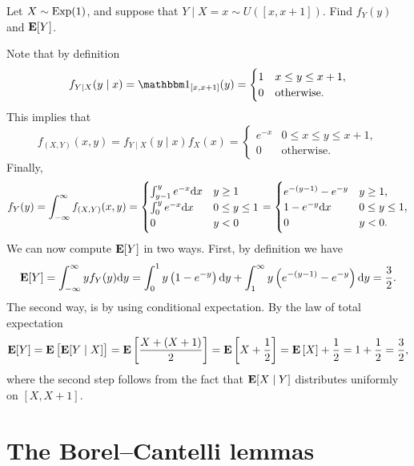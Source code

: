 \documentclass[11pt,a4paper]{article}
\begin{document}
\begin{exercise}
  Let $X \sim \operatorname{Exp}(1)$, and suppose that $Y \mid X = x \sim U([x,x+1])$.
  Find $f_Y(y)$ and $\mathbf{E}[Y]$.
\end{exercise}
\begin{solution}
  Note that by definition
  \[
    f_{Y \mid X}(y \mid x) =
    \ind_{[x,x+1]}(y) =
    \begin{cases}
      1 &x \le y \le x+1, \\
      0 &\text{otherwise}.
    \end{cases}
  \]
  This implies that
  \[
    f_{(X,Y)}(x,y) =
    f_{Y \mid X}(y \mid x) f_X(x) =
    \begin{cases}
      e^{-x} &0 \le x \le y \le x+1, \\
      0 &\text{otherwise}.
    \end{cases}
  \]
  Finally,
  \[
    f_Y(y) =
    \int_{-\infty}^{\infty} f_{(X,Y)}(x,y) =
    \begin{cases}
      \int_{y-1}^{y} e^{-x} \dx &y \geq 1 \\
      \int_{0}^{y} e^{-x} \dx &0 \le y \le 1 \\
      0 &y < 0
    \end{cases} =
    \begin{cases}
      e^{-(y-1)} - e^{-y} &y \geq 1, \\
      1 - e^{-y} \dx &0 \le y \le 1, \\
      0 &y < 0.
    \end{cases}
  \]
  We can now compute $\mathbf{E}[Y]$ in two ways.
  First, by definition we have
  \[
    \E[Y] =
    \int_{-\infty}^{\infty} y f_Y(y) \dy =
    \int_{0}^{1} y \del{1 - e^{-y}} \dy +
    \int_{1}^{\infty} y \del{e^{-(y-1)} - e^{-y}} \dy =
    \frac{3}{2}.
  \]
  The second way, is by using conditional expectation.
  By the law of total expectation
  \[
    \mathbf{E}[Y] =
    \mathbf{E}\left[\mathbf{E}[Y \mid X]\right] =
    \mathbf{E}\left[\frac{X + (X + 1)}{2}\right] =
    \mathbf{E}\left[X + \frac{1}{2}\right] =
    \mathbf{E}\left[X\right] + \frac{1}{2} =
    1 + \frac{1}{2} = \frac{3}{2},
  \]
  where the second step
  follows from the fact that $\mathbf{E}[X \mid Y]$ distributes uniformly on $[X,X+1]$.
\end{solution}


\newpage

\section{The Borel--Cantelli lemmas}
\end{document}
